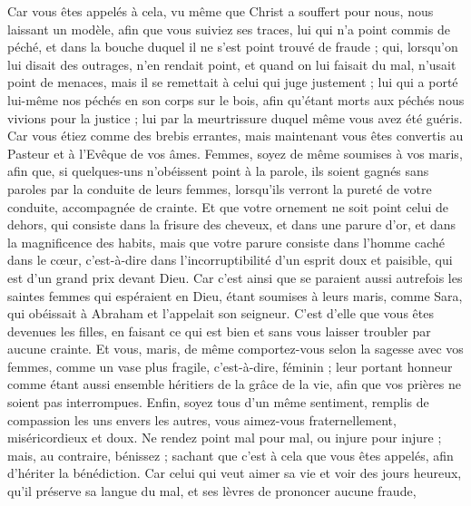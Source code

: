 \begin{multicols}{2}
Car vous êtes appelés à cela, vu même que Christ a souffert pour nous, nous laissant un modèle, afin que vous suiviez ses traces, 
lui qui n'a point commis de péché, et dans la bouche duquel il ne s'est point trouvé de fraude ;
qui, lorsqu'on lui disait des outrages, n'en rendait point, et quand on lui faisait du mal, n'usait point de menaces, mais il se remettait à celui qui juge justement ; 
lui qui a porté lui-même nos péchés en son corps sur le bois, afin qu'étant morts aux péchés nous vivions pour la justice ; lui par la meurtrissure duquel même vous avez été guéris.
Car vous étiez comme des brebis errantes, mais maintenant vous êtes convertis au Pasteur et à l'Evêque de vos âmes. 
\VerseOne{}Femmes, soyez de même soumises à vos maris, afin que, si quelques-uns n'obéissent point à la parole, ils soient gagnés sans paroles par la conduite de leurs femmes,
lorsqu'ils verront la pureté de votre conduite, accompagnée de crainte.
Et que votre ornement ne soit point celui de dehors, qui consiste dans la frisure des cheveux, et dans une parure d'or, et dans la magnificence des habits,
mais que votre parure consiste dans l’homme caché dans le cœur, c’est-à-dire dans l’incorruptibilité d’un esprit doux et paisible, qui est d’un grand prix devant Dieu.
Car c'est ainsi que se paraient aussi autrefois les saintes femmes qui espéraient en Dieu, étant soumises à leurs maris,
comme Sara, qui obéissait à Abraham et l'appelait son seigneur. C'est d'elle que vous êtes devenues les filles, en faisant ce qui est bien et sans vous laisser troubler par aucune crainte.
Et vous, maris, de même comportez-vous selon la sagesse avec vos femmes, comme un vase plus fragile, c'est-à-dire, féminin ; leur portant honneur comme étant aussi ensemble héritiers de la grâce de la vie, afin que vos prières ne soient pas interrompues. 
 Enfin, soyez tous d'un même sentiment, remplis de compassion les uns envers les autres, vous aimez-vous fraternellement, miséricordieux et doux.
Ne rendez point mal pour mal, ou injure pour injure ; mais, au contraire, bénissez ; sachant que c'est à cela que vous êtes appelés, afin d'hériter la bénédiction.
Car celui qui veut aimer sa vie et voir des jours heureux, qu'il préserve sa langue du mal, et ses lèvres de prononcer aucune fraude,

\end{multicols}
